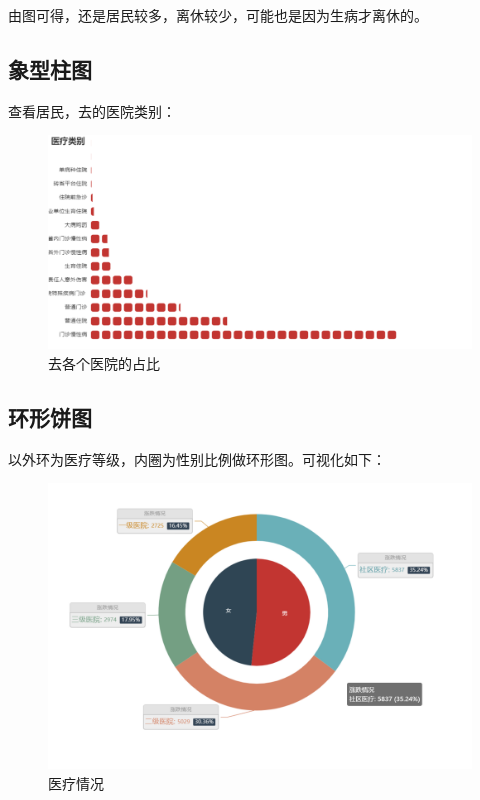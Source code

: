 \documentclass[12pt]{article}
\begin{document}
由图可得，还是居民较多，离休较少，可能也是因为生病才离休的。

\subsection{象型柱图}
查看居民，去的医院类别：

\begin{figure}[ht]
\centering
\includegraphics[scale=0.7]{figures/14.png}
\caption{去各个医院的占比}\label{fig:label2}
\end{figure}


\subsection{环形饼图}

以外环为医疗等级，内圈为性别比例做环形图。可视化如下：

\begin{figure}[ht]
\centering
\includegraphics[scale=0.5]{figures/11.png}
\caption{医疗情况}\label{fig:label2}
\end{figure}
\end{document}
